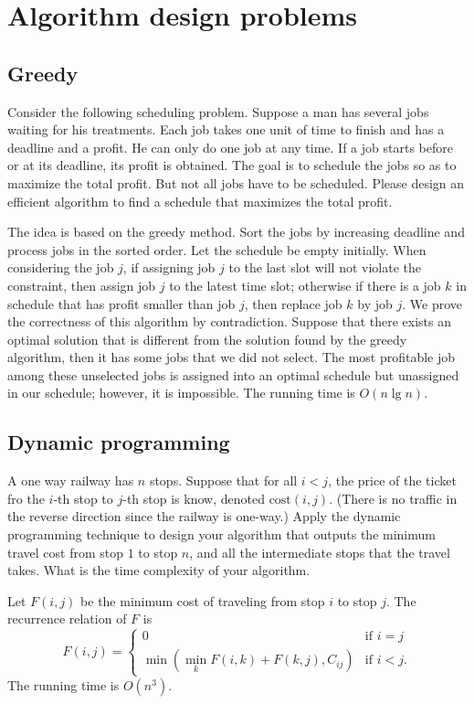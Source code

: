 \chapter{Algorithm design problems}

\section{Greedy}
\begin{Exercise}[origin={NTU CSIE 97, NTNU CSIE 97}]
Consider the following scheduling problem. Suppose a man has several jobs waiting for his treatments. Each job takes one unit of time to finish and has a deadline and a profit. He can only do one job at any time. If a job starts before or at its deadline, its profit is obtained. The goal is to schedule the jobs so as to maximize the total profit. But not all jobs have to be scheduled. Please design an efficient algorithm to find a schedule that maximizes the total profit.
\end{Exercise}
\begin{Answer}
The idea is based on the greedy method. Sort the jobs by increasing deadline and process jobs in the sorted order.
Let the schedule be empty initially. When considering the job $j$, if assigning job $j$ to the last slot will not violate the constraint, then assign job $j$ to the latest time slot; otherwise if there is a job $k$ in schedule that has profit smaller than job $j$, then replace job $k$ by job $j$. We prove the correctness of this algorithm by contradiction. Suppose that there exists an optimal solution that is different from the solution found by the greedy algorithm, then it has some jobs that we did not select. The most profitable job among these unselected jobs is assigned into an optimal schedule but unassigned in our schedule; however, it is impossible. The running time is $O(n \lg n)$.
\end{Answer}


\section{Dynamic programming}
\begin{Exercise}[origin={CYCU CSIE 90}]
A one way railway has $n$ stops. Suppose that for all $i < j$, the price of the ticket fro the $i$-th stop to $j$-th stop is know, denoted $\text{cost}(i, j)$. (There is no traffic in the reverse direction since the railway is one-way.) Apply the dynamic programming technique to design your algorithm that outputs the minimum travel cost from stop $1$ to stop $n$, and all the intermediate stops that the travel takes. What is the time complexity of your algorithm.
\end{Exercise}
\begin{Answer}
Let $F(i, j)$ be the minimum cost of traveling from stop $i$ to stop $j$. The recurrence relation of $F$ is 
\[ F(i, j) = 
   \begin{cases}
    0 & \text{if } i = j \\
    \min( \min_k F(i, k) + F(k, j), C_{ij}) & \text{if } i < j.
    \end{cases} \]
The running time is $O(n^3)$.
\end{Answer}

